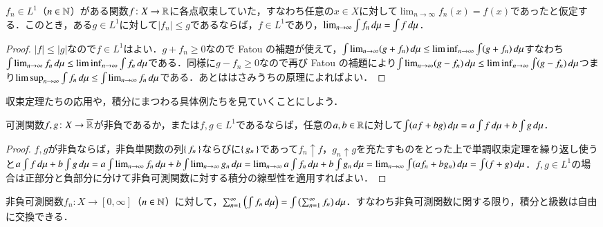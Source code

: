 \begin{thm}
$f_n \in L^1$（$n \in \mathbb{N}$）がある関数$f \colon X \to \mathbb{R}$に各点収束していた，すなわち任意の$x \in X$に対して$\lim_{n \to \infty} f_n(x) = f(x)$であったと仮定する．このとき，ある$g \in L^1$に対して$|f_n| \leq g$であるならば，$f \in L^1$であり，$\lim_{n\to\infty} \int f_n \mathop{}\!d \mu = \int f \mathop{}\!d \mu$．
\end{thm}

\begin{proof}
$|f| \leq |g|$なので$f \in L^1$はよい．$g+f_n \geq 0$なので Fatou の補題が使えて，$\int \lim_{n \to \infty} (g+f_n) \mathop{}\!d \mu \leq \liminf_{n \to \infty} \int (g+f_n) \mathop{}\!d \mu$すなわち$\int \lim_{n \to \infty} f_n \mathop{}\!d \mu \leq \liminf_{n \to \infty} \int f_n \mathop{}\!d \mu$である．同様に$g-f_n \geq 0$なので再び Fatou の補題により$\int \lim_{n \to \infty} (g-f_n) \mathop{}\!d \mu \leq \liminf_{n \to \infty} \int (g-f_n) \mathop{}\!d \mu$つまり$\limsup_{n \to \infty} \int f_n \mathop{}\!d \mu \leq \int \lim_{n \to \infty} f_n \mathop{}\!d \mu$である．あとははさみうちの原理によればよい．
\end{proof}

収束定理たちの応用や，積分にまつわる具体例たちを見ていくことにしよう．

\begin{cor}[積分の線型性]
可測関数$f, g \colon X \to \overline{\mathbb{R}}$が非負であるか，または$f,g \in L^1$であるならば，任意の$a,b \in \mathbb{R}$に対して$\int (af+bg) \mathop{}\!d \mu = a\int f \mathop{}\!d \mu + b\int g \mathop{}\!d \mu$．
\end{cor}

\begin{proof}
$f,g$が非負ならば，非負単関数の列$\set{f_n}$ならびに$\set{g_n}$であって$f_n \uparrow f$，$g_n \uparrow g$を充たすものをとった上で単調収束定理を繰り返し使うと$a\int f \dif \mu + b\int g \dif \mu = a \int \lim_{n\to \infty}  f_n \dif \mu  + b \int \lim_{n\to \infty}  g_n \dif \mu = \lim_{n\to \infty} a \int f_n \dif \mu  + b \int g_n \dif \mu = \lim_{n\to \infty}\int (af_n + bg_n) \dif \mu = \int (f+g) \dif \mu$．$f,g \in L^1$の場合は正部分と負部分に分けて非負可測関数に対する積分の線型性を適用すればよい．
\end{proof}

\begin{thm}
非負可測関数$f_n \colon X \to [0,\infty]$（$n \in \mathbb{N}$）に対して，$\sum_{n=1}^\infty \left(\int f_n \mathop{}\!d \mu\right)  = \int  \left(\sum_{n=1}^\infty f_n\right) \mathop{}\!d \mu$．すなわち非負可測関数に関する限り，積分と級数は自由に交換できる．
\end{thm}

